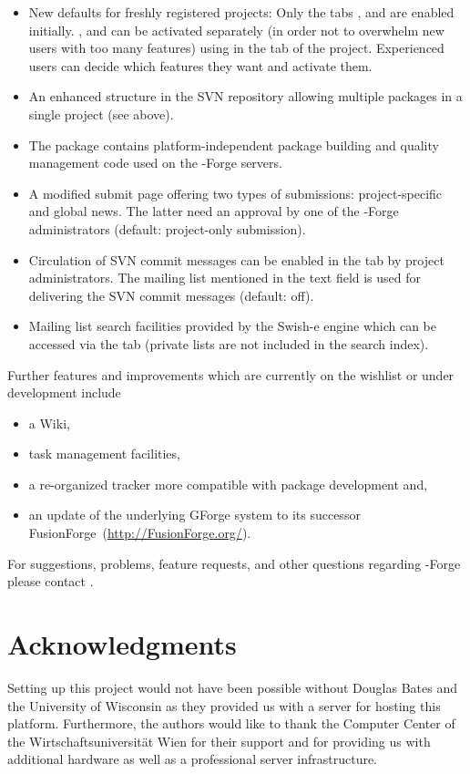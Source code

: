 \begin{itemize}
\item New defaults for freshly registered projects: Only the tabs
  ,  and  are enabled
  initially. ,  and 
  can be activated separately (in order not to overwhelm
  new users with too many features) using  in
  the  tab of the project. Experienced users can decide
  which features they want and activate them.
\item An enhanced structure in the SVN repository allowing multiple
  packages in a single project (see above).
\item The \R{} package  \citep{forge:theussl:2008}
  contains platform-independent package
  building and quality management code used on the \R{}-Forge servers.
\item A modified  submit page offering two types of
  submissions: project-specific and global news. The latter
  need an approval by one of the \R{}-Forge administrators (default:
  project-only submission).
\item Circulation of SVN commit messages can be enabled in the
   tab by project administrators. The mailing list mentioned in
  the text field is used for delivering the SVN commit messages
  (default: off). 
\item Mailing list search facilities provided by the Swish-e engine
  which can be accessed via the  tab (private lists
  are not included in the search index).

\end{itemize}

Further features and improvements which are currently on the wishlist
or under development include 

\begin{itemize}
\item a Wiki,
\item task management facilities,
\item a re-organized tracker more compatible with \R{} package
  development and,
\item an update of the underlying GForge system to its successor
  FusionForge~(\url{http://FusionForge.org/}).
\end{itemize}

For suggestions, problems, feature requests, and other questions regarding
\R{}-Forge please contact .

\section{Acknowledgments}

Setting up this project would not have been possible without Douglas
Bates and the University of Wisconsin as they provided us with a
server for hosting this platform. Furthermore, 
the authors would like to thank the Computer Center 
of the Wirtschaftsuniversit\"at Wien for
their support and for providing us with additional hardware as well as a
professional server infrastructure.


